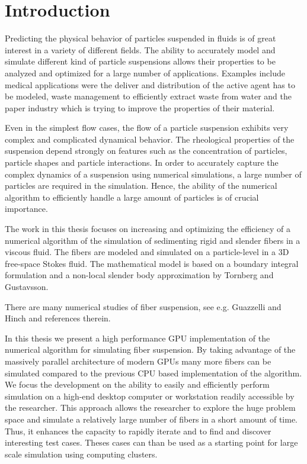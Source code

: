 \chapter{Introduction}

Predicting the physical behavior of particles suspended in fluids is of great interest in a variety of different fields. The ability to accurately model and simulate different kind of particle suspensions allows their properties to be analyzed and optimized for a large number of applications. Examples include medical applications were the deliver and distribution of the active agent has to be modeled, waste management to efficiently extract waste from water and the paper industry which is trying to improve the properties of their material.

Even in the simplest flow cases, the flow of a particle suspension exhibits very complex and complicated dynamical behavior. The rheological properties of the suspension depend strongly on features such as the concentration of particles, particle shapes and particle interactions. In order to accurately capture the complex dynamics of a suspension using numerical simulations, a large number of particles are required in the simulation. Hence, the ability of the numerical algorithm to efficiently handle a large amount of particles is of crucial importance.

The work in this thesis focuses on increasing and optimizing the efficiency of a numerical algorithm of the simulation of sedimenting rigid and slender fibers in a viscous fluid. The fibers are modeled and simulated on a particle-level in a 3D free-space Stokes fluid. The mathematical model is based on a boundary integral formulation and a non-local slender body approximation by Tornberg and Gustavsson\cite{Tornberg2006}. 

There are many numerical studies of fiber suspension, see e.g. Guazzelli and Hinch\cite{Guazzelli2011} and references therein.

In this thesis we present a high performance GPU implementation of the numerical algorithm for simulating fiber suspension. By taking advantage of the massively parallel architecture of modern GPUs many more fibers can be simulated compared to the previous CPU based implementation of the algorithm. We focus the development on the ability to easily and efficiently perform simulation on a high-end desktop computer or workstation readily accessible by the researcher. This approach allows the researcher to explore the huge problem space and simulate a relatively large number of fibers in a short amount of time. Thus, it enhances the capacity to rapidly iterate and to find and discover interesting test cases. Theses cases can than be used as a starting point for large scale simulation using computing clusters.

